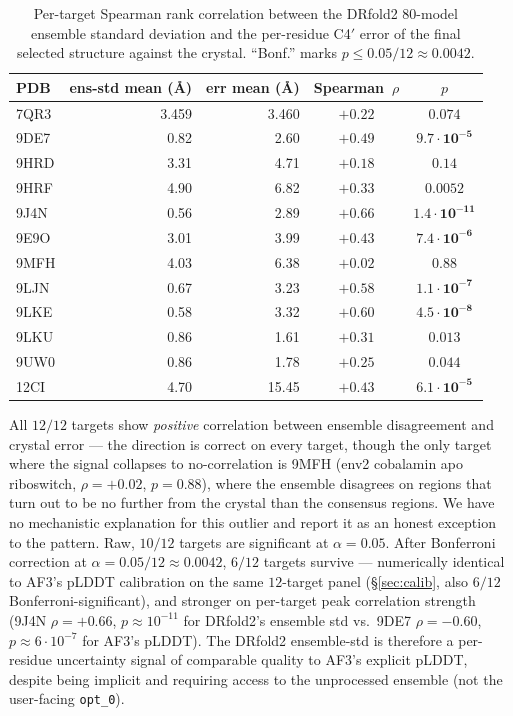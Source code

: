 \documentclass[11pt,a4paper]{article}
\begin{document}
\begin{table}[h!]
\centering
\caption{Per-target Spearman rank correlation between the DRfold2
$80$-model ensemble standard deviation and the per-residue C4$'$
error of the final selected structure against the crystal.
``Bonf.'' marks $p \leq 0.05/12 \approx 0.0042$.}
\label{tab:ensemble}
\small
\begin{tabular}{lrrcc}
\toprule
PDB & ens-std mean (\AA{}) & err mean (\AA{}) & Spearman~$\rho$ & $p$ \\
\midrule
7QR3 & 3.459 & 3.460 & $+0.22$ & $0.074$ \\
9DE7 & 0.82 & 2.60  & $\mathbf{+0.49}$ & $\mathbf{9.7\!\cdot\!10^{-5}}$ \\
9HRD & 3.31 & 4.71  & $+0.18$ & $0.14$ \\
9HRF & 4.90 & 6.82  & $+0.33$ & $0.0052$ \\
9J4N & 0.56 & 2.89  & $\mathbf{+0.66}$ & $\mathbf{1.4\!\cdot\!10^{-11}}$ \\
9E9O & 3.01 & 3.99  & $\mathbf{+0.43}$ & $\mathbf{7.4\!\cdot\!10^{-6}}$ \\
9MFH & 4.03 & 6.38  & $+0.02$ & $0.88$ \\
9LJN & 0.67 & 3.23  & $\mathbf{+0.58}$ & $\mathbf{1.1\!\cdot\!10^{-7}}$ \\
9LKE & 0.58 & 3.32  & $\mathbf{+0.60}$ & $\mathbf{4.5\!\cdot\!10^{-8}}$ \\
9LKU & 0.86 & 1.61  & $+0.31$ & $0.013$ \\
9UW0 & 0.86 & 1.78  & $+0.25$ & $0.044$ \\
12CI & 4.70 & 15.45 & $\mathbf{+0.43}$ & $\mathbf{6.1\!\cdot\!10^{-5}}$ \\
\bottomrule
\end{tabular}
\end{table}

All $12/12$ targets show \emph{positive} correlation between
ensemble disagreement and crystal error --- the direction is correct
on every target, though the only target where the signal collapses
to no-correlation is 9MFH (env2 cobalamin apo riboswitch,
$\rho = +0.02$, $p = 0.88$), where the ensemble disagrees on regions
that turn out to be no further from the crystal than the consensus
regions. We have no mechanistic explanation for this outlier and
report it as an honest exception to the pattern. Raw, $10/12$ targets are significant at $\alpha=0.05$.
After Bonferroni correction at $\alpha = 0.05/12 \approx 0.0042$,
$6/12$ targets survive --- numerically identical to AF3's pLDDT
calibration on the same $12$-target panel (\S\ref{sec:calib}, also
$6/12$ Bonferroni-significant), and stronger on per-target peak
correlation strength (9J4N $\rho=+0.66$, $p \approx 10^{-11}$
for DRfold2's ensemble std vs.\ 9DE7 $\rho=-0.60$, $p \approx
6 \cdot 10^{-7}$ for AF3's pLDDT). The DRfold2 ensemble-std is
therefore a per-residue uncertainty signal of comparable quality
to AF3's explicit pLDDT, despite being implicit and requiring access
to the unprocessed ensemble (not the user-facing \texttt{opt\_0}).
\end{document}
